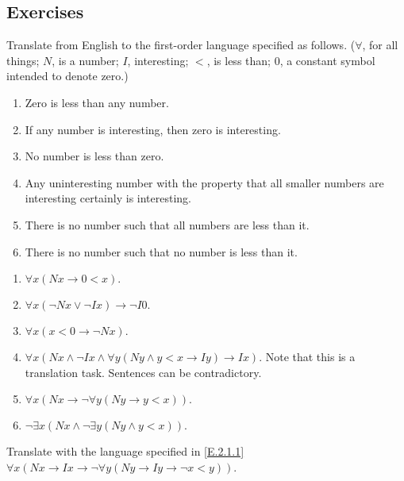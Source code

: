 \subsection*{Exercises}

\begin{exercise}
  Translate from English to the first-order language specified as follows. ($\forall$, for all things; $N$, is a number; $I$, interesting; $<$, is less than; $0$, a constant symbol intended to denote zero.)
  \begin{enumerate}[label=(\alph*)]
    \item Zero is less than any number.
    \item If any number is interesting, then zero is interesting.
    \item No number is less than zero.
    \item Any uninteresting number with the property that all smaller numbers are interesting certainly is interesting.
    \item There is no number such that all numbers are less than it.
    \item There is no number such that no number is less than it.\qedhere
  \end{enumerate}
\end{exercise}

\begin{enumerate}
  \item \(
        \forall x(Nx\rightarrow 0<x).
        \)
  \item \(
        \forall x (\neg Nx\vee\neg Ix )\rightarrow \neg I0.
        \)
  \item \(
        \forall x (x<0\rightarrow\neg Nx).
        \)
  \item \(
        \forall x(Nx\wedge\neg Ix\wedge\forall y (Ny\wedge y<x\rightarrow Iy)\rightarrow Ix).
        \) Note that this is a translation task. Sentences can be contradictory.
  \item \(
        \forall x(Nx\rightarrow\neg\forall y(Ny\rightarrow y<x)).
        \)
  \item \(
        \neg\exists x(Nx\wedge\neg\exists y(Ny\wedge y<x)).
        \)
\end{enumerate}

\begin{exercise}
  Translate with the language specified in \ref{E.2.1.1} $\forall x(Nx\rightarrow Ix\rightarrow\neg\forall y(Ny\rightarrow Iy\rightarrow\neg x<y))$.
\end{exercise}


